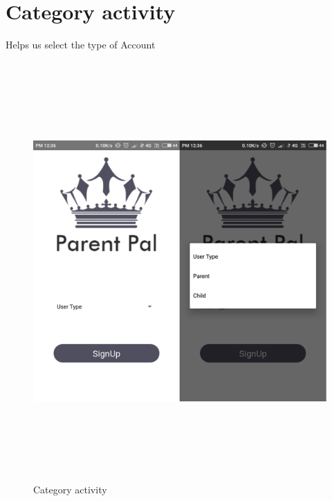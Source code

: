 \section{Category activity}
Helps us select the type of Account
\begin{figure}[!h]
	\centering
	\includegraphics[height=6.3in]{catf.PNG}
	\caption{Category activity}
\end{figure}
\newpage
